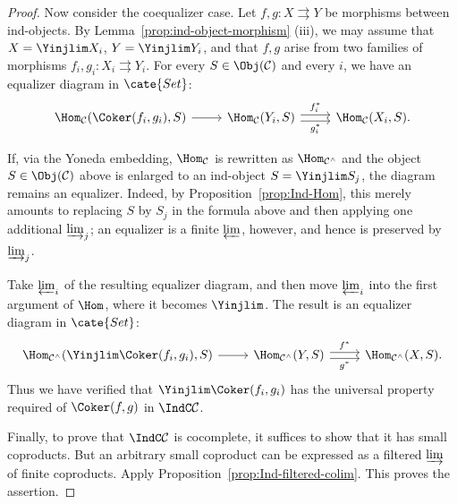\begin{proof}
	Now consider the coequalizer case. Let $f,g:X\rightrightarrows Y$ be morphisms between ind-objects. By Lemma~\ref{prop:ind-object-morphism} (iii), we may assume that $X=\Yinjlim X_i$, $Y=\Yinjlim Y_i$, and that $f,g$ arise from two families of morphisms $f_i,g_i:X_i\rightrightarrows Y_i$. For every $S\in\Obj(\mathcal{C})$ and every $i$, we have an equalizer diagram in $\cate{Set}$:
	\[\begin{tikzcd}
		\Hom_{\mathcal{C}}(\Coker(f_i, g_i), S) \arrow[r] &
		\Hom_{\mathcal{C}}(Y_i, S) \arrow[r, shift left, "{f_i^*}"] \arrow[r, shift right, "{g_i^*}"'] & \Hom_{\mathcal{C}}(X_i, S).
	\end{tikzcd}\]

	If, via the Yoneda embedding, $\Hom_{\mathcal{C}}$ is rewritten as $\Hom_{\mathcal{C}^\wedge}$ and the object $S\in\Obj(\mathcal{C})$ above is enlarged to an ind-object $S=\Yinjlim S_j$, the diagram remains an equalizer. Indeed, by Proposition~\ref{prop:Ind-Hom}, this merely amounts to replacing $S$ by $S_j$ in the formula above and then applying one additional $\varinjlim_j$; an equalizer is a finite $\varprojlim$, however, and hence is preserved by $\varinjlim_j$.

	Take $\varprojlim_i$ of the resulting equalizer diagram, and then move $\varprojlim_i$ into the first argument of $\Hom$, where it becomes $\Yinjlim$. The result is an equalizer diagram in $\cate{Set}$:
	\[\begin{tikzcd}
		\Hom_{\mathcal{C}^\wedge}(\Yinjlim \Coker(f_i, g_i), S) \arrow[r] &
		\Hom_{\mathcal{C}^\wedge}(Y, S) \arrow[r, shift left, "{f^*}"] \arrow[r, shift right, "{g^*}"'] & \Hom_{\mathcal{C}^\wedge}(X, S).
	\end{tikzcd}\]
	Thus we have verified that $\Yinjlim\Coker(f_i,g_i)$ has the universal property required of $\Coker(f,g)$ in $\IndC\mathcal{C}$.

	Finally, to prove that $\IndC\mathcal{C}$ is cocomplete, it suffices to show that it has small coproducts. But an arbitrary small coproduct can be expressed as a filtered $\varinjlim$ of finite coproducts. Apply Proposition~\ref{prop:Ind-filtered-colim}. This proves the assertion.
\end{proof}
